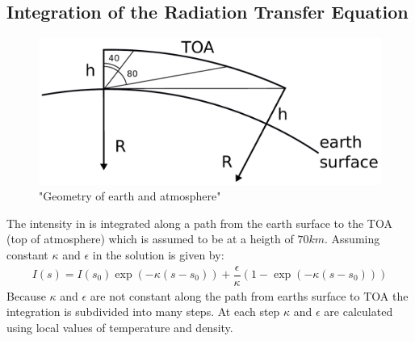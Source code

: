 \subsection{Integration of the Radiation Transfer Equation}

\begin{figure}[ht]
	\includegraphics[width=12cm]{figures/earth_surface_toa.pdf}
	\caption{"Geometry of earth and atmosphere"}
	\label{fig:geometry}
\end{figure}

The intensity in  is integrated along a path from the earth surface to the TOA (top of atmosphere) which is assumed to be at a heigth of $70 km$. Assuming constant $\kappa$ and $\epsilon$ in  the solution is given by:
\begin{align}
	I(s) = I(s_0) \exp( -  \kappa (s-s_0)) + \dfrac{\epsilon}{\kappa} \left(1 - \exp( - \kappa (s-s_0))\right)
\end{align}
Because $\kappa$ and $\epsilon$ are not constant along the path from earths surface to TOA the integration is subdivided into many steps. At each step $\kappa$ and $\epsilon$ are calculated using local values of temperature and density.

